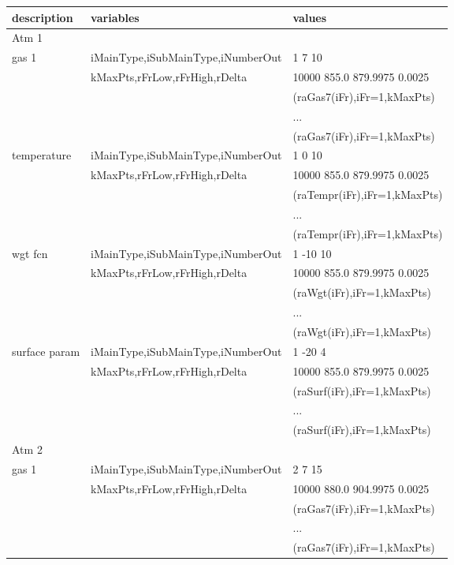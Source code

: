 \documentclass[12pt]{article}
\newlength{\colwidth}
\begin{document}
{{{{\begin{longtable}{llp{\colwidth}}
description&     variables                 & values\\ \hline 
Atm 1         & & \\
gas 1         & iMainType,iSubMainType,iNumberOut  & 1 7 10\\
              & kMaxPts,rFrLow,rFrHigh,rDelta  & 10000 855.0 879.9975 0.0025 \\
              & & (raGas7(iFr),iFr=1,kMaxPts)\\
              & & ... \\ 
              & & (raGas7(iFr),iFr=1,kMaxPts)\\
temperature   & iMainType,iSubMainType,iNumberOut  & 1 0 10\\
              & kMaxPts,rFrLow,rFrHigh,rDelta  & 10000 855.0 879.9975 0.0025 \\
              & & (raTempr(iFr),iFr=1,kMaxPts)\\
              & & ... \\ 
              & & (raTempr(iFr),iFr=1,kMaxPts)\\
wgt fcn       & iMainType,iSubMainType,iNumberOut  & 1 -10 10\\
              & kMaxPts,rFrLow,rFrHigh,rDelta  & 10000 855.0 879.9975 0.0025 \\
              & & (raWgt(iFr),iFr=1,kMaxPts)\\
              & & ... \\ 
              & & (raWgt(iFr),iFr=1,kMaxPts)\\
surface param & iMainType,iSubMainType,iNumberOut  & 1 -20 4\\
              & kMaxPts,rFrLow,rFrHigh,rDelta  & 10000 855.0 879.9975 0.0025 \\
              & & (raSurf(iFr),iFr=1,kMaxPts)\\
              & & ... \\ 
              & & (raSurf(iFr),iFr=1,kMaxPts)\\
Atm 2         & & \\
gas 1         & iMainType,iSubMainType,iNumberOut  & 2 7 15\\
              & kMaxPts,rFrLow,rFrHigh,rDelta  & 10000 880.0 904.9975 0.0025 \\
              & & (raGas7(iFr),iFr=1,kMaxPts)\\
              & & ... \\ 
              & & (raGas7(iFr),iFr=1,kMaxPts)\\

\end{longtable}}}}}
\end{document}
